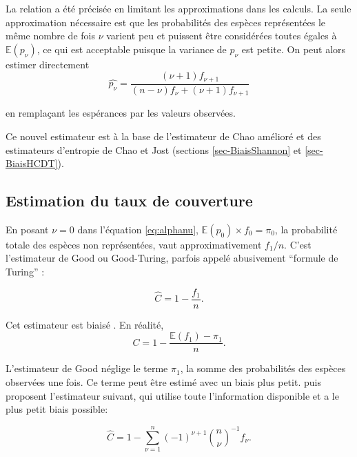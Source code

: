 \documentclass[
  11pt,
  american,
  a4paper,
  extrafontsizes,onecolumn,openright
  ]{memoir}
\newlength{\rf}
\begin{document}
La relation a été précisée \autocite[eq. 6 et 7a]{Chiu2014a} en limitant les approximations dans les calculs.
La seule approximation nécessaire est que les probabilités des espèces représentées le même nombre de fois \(\nu\) varient peu et puissent être considérées toutes égales à \({\mathbb E}(p_\nu)\), ce qui est acceptable puisque la variance de \(p_\nu\) est petite.
On peut alors estimer directement
\begin{equation}
  \label{eq:GoodTuring2014}
   \hat{p_\nu} 
   = \frac{\left( \nu + 1 \right) f_{\nu + 1}}{\left(n - \nu \right) f_{\nu} + \left(\nu + 1 \right) f_{\nu + 1}}
\end{equation}

en remplaçant les espérances par les valeurs observées.

Ce nouvel estimateur est à la base de l'estimateur de Chao amélioré et des estimateurs d'entropie de Chao et Jost (sections \ref{sec-BiaisShannon} et \ref{sec-BiaisHCDT}).

\subsection{Estimation du taux de couverture}\label{estimation-du-taux-de-couverture}

En posant \(\nu=0\) dans l'équation \eqref{eq:alphanu}, \({\mathbb E}(p_0) \times f_{0} = \pi_0\), la probabilité totale des espèces non représentées, vaut approximativement \(f_{1}/n\).
C'est l'estimateur de Good ou Good-Turing, parfois appelé abusivement \enquote{formule de Turing} \autocite{Zhang2007}:

\begin{equation}
  \label{eq:CGood}
  \hat{C} = 1 - \frac{f_1}{n}.
\end{equation}

Cet estimateur est biaisé \autocite{Zhang2007}. En réalité,
\begin{equation}
  \label{eq:CsansBiais}
  C = 1 - \frac{{\mathbb E}(f_1) - \pi_1}{n}.
\end{equation}

L'estimateur de Good néglige le terme \(\pi_1\), la somme des probabilités des espèces observées une fois.
Ce terme peut être estimé avec un biais plus petit.
\textcite{Chao1988} puis \textcite{Zhang2007} proposent l'estimateur suivant, qui utilise toute l'information disponible et a le plus petit biais possible:

\begin{equation}
  \label{eq:CZhang}
  \hat{C} = 1 - \sum^{n}_{\nu = 1}{\left( -1 \right)}^{\nu + 1}{\binom{n}{\nu}}^{-1}f_\nu.
\end{equation}
\end{document}
